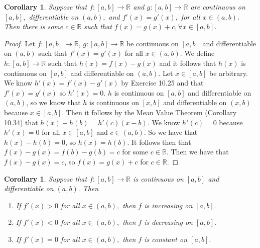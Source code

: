 \documentclass[12pt]{article}
\newcommand{\bbR}{\mathbb{R}}
\providecommand{\sarr}{\rightarrow}
\providecommand{\arr}{\longrightarrow}
\renewcommand{\_}[1]{\underline{ #1 }}
\newtheorem{corollary}[theorem]{Corollary}
\theoremstyle{definition}
\numberwithin{equation}{subsection}
\begin{document}
\begin{corollary} Suppose that $f:[a,b]\sarr \bbR$ and $g:[a,b]\sarr\bbR$  are continuous on $[a,b],$ differentiable on $(a,b), $ and
$f'(x)=g'(x),$ for all $x\in (a,b).$ Then there is some $c\in\bbR$ such that $f(x)=g(x)+c,\forall x\in  [a,b].$ 
\end{corollary} 

\begin{proof}
Let $f:[a,b] \to \bbR$, $g:[a,b] \to \bbR$ be continuous on $[a,b]$ and differentiable on $(a,b)$ such that $f'(x) = g'(x)$ for all $x \in (a,b)$. We define $h:[a,b] \to \bbR$ such that $h(x) = f(x) - g(x)$ and it follows that $h(x)$ is continuous on $[a,b]$ and differentiable on $(a,b)$. \newline
Let $x \in [a,b]$ be arbitrary. We know $h'(x) = f'(x) - g'(x)$ by Exercise 10.25 and that $f'(x) = g'(x)$ so $h'(x) = 0$. $h$ is continuous on $[a,b]$ and differentiable on $(a,b)$, so we know that $h$ is continuous on $[x,b]$ and differentiable on $(x,b)$ because $x \in [a,b]$. Then it follows by the Mean Value Theorem (Corollary 10.34) that $h(x) - h(b) = h'(c)(x-b)$. We know $h'(c) = 0$ because $h'(x) = 0$ for all $x \in [a,b]$ and $c \in (a,b)$. So we have that $h(x) - h(b) = 0$, so $h(x) = h(b)$. It follows then that $f(x) - g(x) = f(b) - g(b) = c$ for some $c \in \bbR$. Then we have that $f(x) - g(x) = c$, so $f(x) = g(x) + c$ for $c \in \bbR$.
\end{proof}

\begin{corollary}  Suppose that $f \colon [a, b] \arr \bbR$ is continuous on $[a,b]$ and differentiable on $(a, b).$ Then

\begin{enumerate}
\item If $f'(x)>0$ for all $x\in (a,b),$ then $f$ is increasing on $[a,b].$
\item If $f'(x)<0$ for all $x\in (a,b),$ then $f$ is decreasing on $[a,b].$
\item If $f'(x)=0$ for all $x\in (a,b),$ then $f$ is constant on $[a,b].$
\end{enumerate}
\end{corollary}
\end{document}
